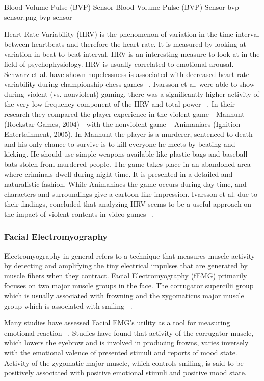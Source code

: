 \img
{Blood Volume Pulse (BVP) Sensor}
{Blood Volume Pulse (BVP) Sensor}
{bvp-sensor.png}
{bvp-sensor}

Heart Rate Variability (HRV) is the phenomenon of variation in the time interval between heartbeats and therefore the heart rate. It is measured by looking at variation in beat-to-beat interval. HRV is an interesting measure to look at in the field of psychophysiology. HRV is usually correlated to emotional arousal. Schwarz et al. have shown hopelessness is associated with decreased heart rate variability during championship chess games ~\cite{schwarz2003hopelessness}. Ivarsson et al. were able to show during violent (vs. nonviolent) gaming, there was a significantly higher activity of the very low frequency component of the HRV and total power ~\cite{ivarsson2009playing}. In their research they compared the player experience in the violent game - Manhunt (Rockstar Games, 2004) - with the nonviolent game – Animaniacs (Ignition Entertainment, 2005). In Manhunt the player is a murderer, sentenced to death and his only chance to survive is to kill everyone he meets by beating and kicking. He should use simple weapons available like plastic bags and baseball bats stolen from murdered people. The game takes place in an abandoned area where criminals dwell during night time. It is presented in a detailed and naturalistic fashion. While Animaniacs the game occurs during day time, and characters and surroundings give a cartoon-like impression. Ivarsson et al. due to their findings, concluded that analyzing HRV seems to be a useful approach on the impact of violent contents in video games ~\cite{ivarsson2009playing}.

\subsubsection{Facial Electromyography}

Electromyography in general refers to a technique that measures muscle activity by detecting and amplifying the tiny electrical impulses that are generated by muscle fibers when they contract. Facial Electromyography (fEMG) primarily focuses on two major muscle groups in the face. The corrugator supercilii group which is usually associated with frowning and the zygomaticus major muscle group which is associated with smiling ~\cite{larsen2003effects, sato2008enhanced}.

Many studies have assessed Facial EMG's utility as a tool for measuring emotional reaction ~\cite{dimberg1990facial}. Studies have found that activity of the corrugator muscle, which lowers the eyebrow and is involved in producing frowns, varies inversely with the emotional valence of presented stimuli and reports of mood state. Activity of the zygomatic major muscle, which controls smiling, is said to be positively associated with positive emotional stimuli and positive mood state.

